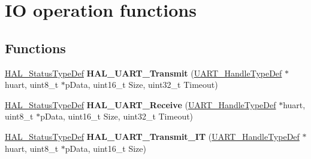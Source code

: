 \hypertarget{group___u_a_r_t___exported___functions___group2}{}\section{IO operation functions}
\label{group___u_a_r_t___exported___functions___group2}
\subsection*{Functions}
\begin{DoxyCompactItemize}
\item 
\mbox{\label{group___u_a_r_t___exported___functions___group2_ga210329848c1873957034e129ccf8944e}} 
\mbox{\hyperlink{stm32f7xx__hal__def_8h_a63c0679d1cb8b8c684fbb0632743478f}{H\+A\+L\+\_\+\+Status\+Type\+Def}} {\bfseries H\+A\+L\+\_\+\+U\+A\+R\+T\+\_\+\+Transmit} (\mbox{\hyperlink{group___u_a_r_t___exported___types_ga7adf4f3e4c3ecde572be5925c915a967}{U\+A\+R\+T\+\_\+\+Handle\+Type\+Def}} $\ast$huart, uint8\+\_\+t $\ast$p\+Data, uint16\+\_\+t Size, uint32\+\_\+t Timeout)
\item 
\mbox{\label{group___u_a_r_t___exported___functions___group2_gab868edc590e3b827a14528a25c999e2f}} 
\mbox{\hyperlink{stm32f7xx__hal__def_8h_a63c0679d1cb8b8c684fbb0632743478f}{H\+A\+L\+\_\+\+Status\+Type\+Def}} {\bfseries H\+A\+L\+\_\+\+U\+A\+R\+T\+\_\+\+Receive} (\mbox{\hyperlink{group___u_a_r_t___exported___types_ga7adf4f3e4c3ecde572be5925c915a967}{U\+A\+R\+T\+\_\+\+Handle\+Type\+Def}} $\ast$huart, uint8\+\_\+t $\ast$p\+Data, uint16\+\_\+t Size, uint32\+\_\+t Timeout)
\item 
\mbox{\label{group___u_a_r_t___exported___functions___group2_gaf223f2bcc2f5734f147cc5c626d757b0}} 
\mbox{\hyperlink{stm32f7xx__hal__def_8h_a63c0679d1cb8b8c684fbb0632743478f}{H\+A\+L\+\_\+\+Status\+Type\+Def}} {\bfseries H\+A\+L\+\_\+\+U\+A\+R\+T\+\_\+\+Transmit\+\_\+\+IT} (\mbox{\hyperlink{group___u_a_r_t___exported___types_ga7adf4f3e4c3ecde572be5925c915a967}{U\+A\+R\+T\+\_\+\+Handle\+Type\+Def}} $\ast$huart, uint8\+\_\+t $\ast$p\+Data, uint16\+\_\+t Size)
\item 
\mbox{\label{group___u_a_r_t___exported___functions___group2_gadc0c3ef2109881d011601f0d41e70e40}} 

\end{DoxyCompactItemize}
